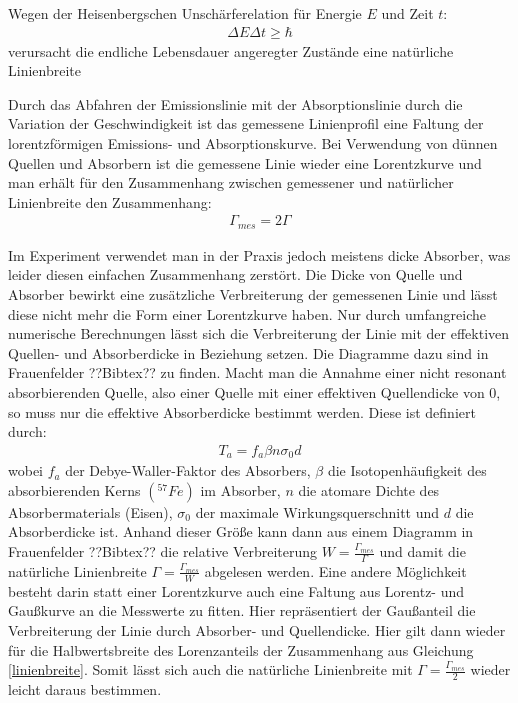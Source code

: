 \documentclass[12pt]{article}
\begin{document}
Wegen der Heisenbergschen Unschärferelation für Energie $E$ und Zeit $t$:
\begin{align}
 \Delta E \Delta t \geq \hbar
\end{align}
verursacht die endliche Lebensdauer angeregter Zustände eine natürliche Linienbreite

Durch das Abfahren der Emissionslinie mit der Absorptionslinie durch die Variation der Geschwindigkeit ist das gemessene Linienprofil eine Faltung der lorentzförmigen
Emissions- und Absorptionskurve. Bei Verwendung von dünnen Quellen und Absorbern ist die gemessene Linie wieder eine Lorentzkurve und man erhält für den Zusammenhang
zwischen gemessener und natürlicher Linienbreite den Zusammenhang:
\begin{align}
 \label{linienbreite}
 \Gamma_{mes} = 2\Gamma
\end{align}

Im Experiment verwendet man in der Praxis jedoch meistens dicke Absorber, was leider diesen einfachen Zusammenhang zerstört. Die Dicke von Quelle und Absorber bewirkt
eine zusätzliche Verbreiterung der gemessenen Linie und lässt diese nicht mehr die Form einer Lorentzkurve haben. Nur durch umfangreiche numerische Berechnungen
lässt sich die Verbreiterung der Linie mit der effektiven Quellen- und Absorberdicke in Beziehung setzen. Die Diagramme dazu sind in Frauenfelder ??Bibtex?? zu finden.
Macht man die Annahme einer nicht resonant absorbierenden Quelle, also einer Quelle mit einer effektiven Quellendicke von 0, so muss nur die effektive Absorberdicke bestimmt
werden. Diese ist definiert durch:
\begin{align}
 T_a = f_a \beta n \sigma_0 d
\end{align}
wobei $f_a$ der Debye-Waller-Faktor des Absorbers, $\beta$ die Isotopenhäufigkeit des absorbierenden Kerns $(^{57}Fe)$ im Absorber, $n$ die atomare Dichte
des Absorbermaterials (Eisen), $\sigma_0$ der maximale Wirkungsquerschnitt und $d$ die Absorberdicke ist. Anhand dieser Größe kann dann aus einem Diagramm in Frauenfelder ??Bibtex??
die relative Verbreiterung $W = \frac{\Gamma_{mes}}{\Gamma}$ und damit die natürliche Linienbreite $\Gamma = \frac{\Gamma_{mes}}{W}$ abgelesen werden.
Eine andere Möglichkeit besteht darin statt einer Lorentzkurve auch eine Faltung aus Lorentz- und Gaußkurve an die Messwerte zu fitten. Hier repräsentiert der Gaußanteil
die Verbreiterung der Linie durch Absorber- und Quellendicke. Hier gilt dann wieder für die Halbwertsbreite des Lorenzanteils der Zusammenhang aus Gleichung \ref{linienbreite}.
Somit lässt sich auch die natürliche Linienbreite mit $\Gamma = \frac{\Gamma_{mes}}{2}$ wieder leicht daraus bestimmen.
\end{document}
